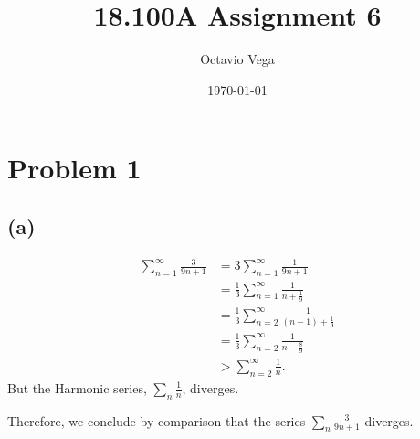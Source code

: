 \documentclass{article}
\title{18.100A Assignment 6}
\author{Octavio Vega}
\date\today
\begin{document}
\maketitle
	
\section*{Problem 1}
\subsection*{(a)}
\begin{align}
	\sum_{n=1}^{\infty} \frac{3}{9n+1} &= 3\sum_{n=1}^{\infty} \frac{1}{9n+1} \\
	&= \frac{1}{3}\sum_{n=1}^{\infty}\frac{1}{n+\frac{1}{9}} \\
	&= \frac{1}{3}\sum_{n=2}^{\infty}\frac{1}{(n-1)+\frac{1}{9}} \\
	&= \frac{1}{3}\sum_{n=2}^{\infty} \frac{1}{n-\frac{8}{9}} \\
	&> \sum_{n=2}^{\infty} \frac{1}{n}.
\end{align}
But the Harmonic series, $\sum_n \frac{1}{n}$, diverges.

Therefore, we conclude by comparison that the series $\sum_n \frac{3}{9n+1}$ diverges.
	
\end{document}
